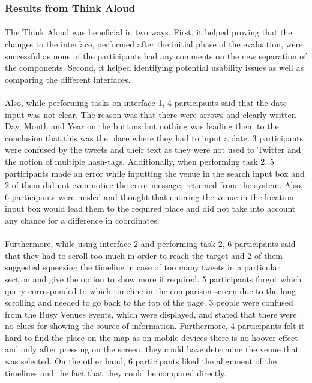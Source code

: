 \documentclass{l4proj}
\begin{document}
\subsubsection{Results from Think Aloud}
\paragraph{}
The Think Aloud was beneficial in two ways. First, it helped proving that the changes to the interface, performed after the initial phase of the evaluation,  were successful as none of the participants had any comments on the new separation of the components. Second, it helped identifying potential usability issues as well as comparing the different interfaces. 
\paragraph{}
Also, while performing tasks on interface 1, 4 participants said that the date input was not clear. The reason was that there were arrows and clearly written Day, Month and Year on the buttons but nothing was leading them to the conclusion that this was the place where they had to input a date. 3 participants were confused by the tweets and their text as they were not used to Twitter and the notion of multiple hash-tags. Additionally, when performing task 2, 5 participants made an error while inputting the venue in the search input box and 2 of them did not even notice the error message, returned from the system. Also, 6 participants were misled and thought that entering the venue in the location input box would lead them to the required place and did not take into account any chance for a difference in coordinates. 
\paragraph{}
Furthermore, while using interface 2 and performing task 2, 6 participants said that they had to scroll too much in order to reach the target and 2 of them suggested squeezing the timeline in case of too many tweets in a particular section and give the option to show more if required. 5 participants forgot which query corresponded to which timeline in the comparison screen due to the long scrolling and needed to go back to the top of the page. 3 people were confused from the Busy Venues events, which were displayed, and stated that there were no clues for showing the source of information. Furthermore, 4 participants felt it hard to find the place on the map as on mobile devices there is no hoover effect and only after pressing on the screen, they could have determine the venue that was selected. On the other hand, 6 participants liked the alignment of the timelines and the fact that they could be compared directly.
\end{document}
